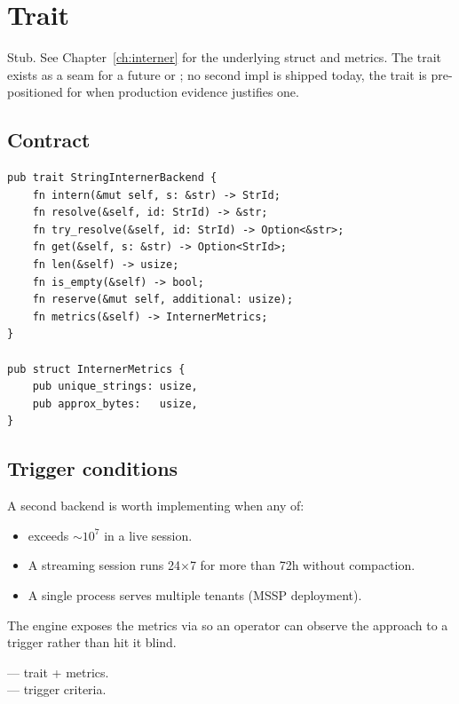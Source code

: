 \chapter{ Trait}
\label{ch:interner-trait}

\begin{note}
Stub. See Chapter~\ref{ch:interner} for the underlying struct and
metrics. The trait exists as a seam for a future
 or ; no
second impl is shipped today, the trait is pre-positioned for when
production evidence justifies one.
\end{note}

\section{Contract}

\begin{lstlisting}[style=rust]
pub trait StringInternerBackend {
    fn intern(&mut self, s: &str) -> StrId;
    fn resolve(&self, id: StrId) -> &str;
    fn try_resolve(&self, id: StrId) -> Option<&str>;
    fn get(&self, s: &str) -> Option<StrId>;
    fn len(&self) -> usize;
    fn is_empty(&self) -> bool;
    fn reserve(&mut self, additional: usize);
    fn metrics(&self) -> InternerMetrics;
}

pub struct InternerMetrics {
    pub unique_strings: usize,
    pub approx_bytes:   usize,
}
\end{lstlisting}

\section{Trigger conditions}

A second backend is worth implementing when any of:
\begin{itemize}
    \item {} exceeds $\sim 10^7$ in
        a live session.
    \item A streaming session runs 24$\times$7 for more than 72h
        without compaction.
    \item A single process serves multiple tenants
        (MSSP deployment).
\end{itemize}

The engine exposes the metrics via
 so an operator can observe the
approach to a trigger rather than hit it blind.

\begin{inthecode}
 --- trait + metrics.\\
 --- trigger criteria.
\end{inthecode}
